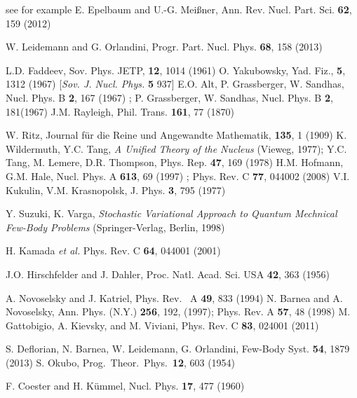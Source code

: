 \begin{thebibliography}{00}
 see for example E. Epelbaum and U.-G. Mei{\ss}ner, Ann. Rev. Nucl. Part. Sci. {\bf 62}, 159 (2012)

 W. Leidemann and G. Orlandini,  Progr. Part.  Nucl. Phys. {\bf 68}, 158  (2013)

 L.D. Faddeev, Sov. Phys. JETP, {\bf 12}, 1014 (1961)
 O. Yakubowsky,   
        Yad. Fiz., {\bf 5}, 1312 (1967) [{\it Sov. J. Nucl. Phys.} {\bf 5} 937]
  E.O. Alt, P. Grassberger, W. Sandhas, Nucl. Phys. B {\bf 2},  167 (1967) ;
               P. Grassberger, W. Sandhas, Nucl. Phys. B {\bf 2}, 181(1967)
 J.M. Rayleigh, Phil. Trans. {\bf 161}, 77 (1870)

 W. Ritz, 
   Journal f\"ur die Reine und Angewandte Mathematik, {\bf 135}, 1 (1909)
 K. Wildermuth, Y.C. Tang, \textit{A Unified Theory of the Nucleus} (Vieweg, 1977);
                Y.C. Tang, M. Lemere, D.R. Thompson, Phys. Rep. {\bf 47}, 169 (1978) 
 H.M. Hofmann, G.M. Hale, Nucl. Phys. A {\bf 613}, 69 (1997) ;
             Phys. Rev. C {\bf 77}, 044002 (2008) 
 V.I. Kukulin, V.M. Krasnopolsk, J. Phys. {\bf 3},  795 (1977)

  Y. Suzuki, K. Varga, \textit{Stochastic Variational Approach to Quantum Mechnical Few-Body Problems} (Springer-Verlag, Berlin, 1998)
                  
  H. Kamada {\it et al.} Phys. Rev. C {\bf 64}, 044001 (2001)       

 J.O. Hirschfelder and J. Dahler, Proc. Natl. Acad. Sci. USA {\bf 42}, 363 (1956)

 A. Novoselsky and J.  Katriel, Phys. Rev.~ A {\bf 49},  833  (1994)
  N. Barnea  and A. Novoselsky,
	 Ann. Phys. (N.Y.)  {\bf 256}, 192, (1997); Phys. Rev.  A {\bf 57},  48 (1998)
  M. Gattobigio, A. Kievsky, and M. Viviani, Phys. Rev. C {\bf 83}, 024001 (2011)

	 S. Deflorian, N. Barnea, W. Leidemann, G. Orlandini, Few-Body Syst. {\bf 54}, 1879 (2013)
 S. Okubo, Prog.~Theor.~Phys.~{\bf 12}, 603 (1954)

 F. Coester and H. K{\"u}mmel, Nucl. Phys.  {\bf 17}, 477 (1960)


\end{thebibliography}
